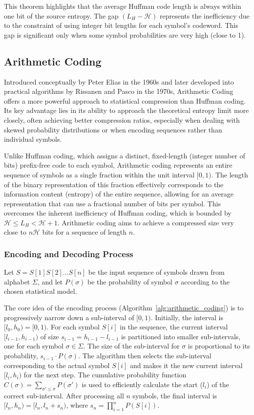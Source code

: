 This theorem highlights that the average Huffman code length is always within one bit of the source entropy. The gap $(L_H - \mathcal{H})$ represents the inefficiency due to the constraint of using integer bit lengths for each symbol's codeword. This gap is significant only when some symbol probabilities are very high (close to 1).

\subsection{Arithmetic Coding} \label{subsec:arithmetic_coding}

Introduced conceptually by Peter Elias in the 1960s and later developed into practical algorithms by Rissanen \cite{rissanen1976generalized} and Pasco \cite{pasco1976source} in the 1970s, Arithmetic Coding offers a more powerful approach to statistical compression than Huffman coding. Its key advantage lies in its ability to approach the theoretical entropy limit more closely, often achieving better compression ratios, especially when dealing with skewed probability distributions or when encoding sequences rather than individual symbols.

Unlike Huffman coding, which assigns a distinct, fixed-length (integer number of bits) prefix-free code to each symbol, Arithmetic coding represents an entire sequence of symbols as a single fraction within the unit interval $[0, 1)$. The length of the binary representation of this fraction effectively corresponds to the information content (entropy) of the entire sequence, allowing for an average representation that can use a fractional number of bits per symbol. This overcomes the inherent inefficiency of Huffman coding, which is bounded by $\mathcal{H} \le L_H < \mathcal{H} + 1$. Arithmetic coding aims to achieve a compressed size very close to $n\mathcal{H}$ bits for a sequence of length $n$.

\subsubsection{Encoding and Decoding Process}
Let $S = S[1]S[2]\ldots S[n]$ be the input sequence of symbols drawn from alphabet $\Sigma$, and let $P(\sigma)$ be the probability of symbol $\sigma$ according to the chosen statistical model.

The core idea of the encoding process (Algorithm~\ref{alg:arithmetic_coding}) is to progressively narrow down a sub-interval of $[0, 1)$. Initially, the interval is $[l_0, h_0) = [0, 1)$. For each symbol $S[i]$ in the sequence, the current interval $[l_{i-1}, h_{i-1})$ of size $s_{i-1} = h_{i-1} - l_{i-1}$ is partitioned into smaller sub-intervals, one for each symbol $\sigma \in \Sigma$. The size of the sub-interval for $\sigma$ is proportional to its probability, $s_{i-1} \cdot P(\sigma)$. The algorithm then selects the sub-interval corresponding to the actual symbol $S[i]$ and makes it the new current interval $[l_i, h_i)$ for the next step. The cumulative probability function $C(\sigma) = \sum_{\sigma' \le \sigma} P(\sigma')$ is used to efficiently calculate the start ($l_i$) of the correct sub-interval. After processing all $n$ symbols, the final interval is $[l_n, h_n) = [l_n, l_n + s_n)$, where $s_n = \prod_{i=1}^n P(S[i])$.


